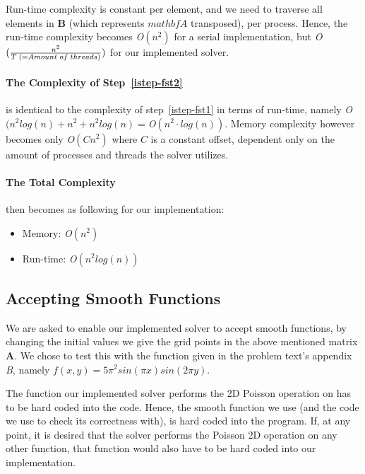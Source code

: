 \documentclass[fontsize=11pt,paper=a4,titlepage]{article}
\begin{document}
Run-time complexity is constant per element, and we need to traverse all
elements in $\mathbf{B}$ (which represents $mathbf{A}$ transposed), per process.
Hence, the run-time complexity becomes \textit{O}$(n^2)$ for a serial
implementation, but \textit{O}$(\frac{n^2}{T\thickspace (=Amount\thickspace of
\thickspace threads)})$ for our implemented solver.

\paragraph{The Complexity of Step~\ref{istep-fst2}} is identical to the
complexity of step~\ref{istep-fst1} in terms of run-time, namely \textit{O}$(n^2
log(n) + n^2 + n^2log(n) = $\textit{O}$(n^2\cdot
log(n))$. Memory complexity however becomes only \textit{O}$(Cn^2)$ where $
C$ is a constant offset, dependent only on the amount of processes and threads
the solver utilizes.

\paragraph{The Total Complexity} then becomes as following for our
implementation:

\begin{itemize}
	\item Memory: \textit{O}$(n^2)$
	\item Run-time: \textit{O}$(n^2log(n))$
\end{itemize}

\subsection{Accepting Smooth Functions}

We are asked to enable our implemented solver to accept smooth functions, by
changing the initial values we give the grid points in the above mentioned matrix
$\mathbf{A}$. We chose to test this with the function given in the problem
text's appendix \textit{B}, namely $f(x,y) = 5\pi^2 sin(\pi x) sin(2\pi y)$.

The function our implemented solver performs the 2D Poisson operation on has to
be hard coded into the code. Hence, the smooth function we use (and the code we
use to check its correctness with), is hard coded into the program. If, at any
point, it is desired that the solver performs the Poisson 2D operation on any
other function, that function would also have to be hard coded into our
implementation.
\end{document}
